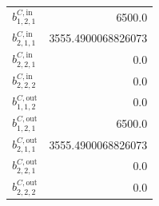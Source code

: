 \documentclass{article}%
\begin{document}
\begin{multicols*}{3}
\begin{supertabular}{lr}
	$b_{1,2,1}^{C,\text{in}}$ & 6500.0 \\%
	$b_{2,1,1}^{C,\text{in}}$ & 3555.4900068826073 \\%
	$b_{2,2,1}^{C,\text{in}}$ & 0.0 \\%
	$b_{2,2,2}^{C,\text{in}}$ & 0.0 \\%
	$b_{1,1,2}^{C,\text{out}}$ & 0.0 \\%
	$b_{1,2,1}^{C,\text{out}}$ & 6500.0 \\%
	$b_{2,1,1}^{C,\text{out}}$ & 3555.4900068826073 \\%
	$b_{2,2,1}^{C,\text{out}}$ & 0.0 \\%
	$b_{2,2,2}^{C,\text{out}}$ & 0.0 \\%
\end{supertabular}%
\end{multicols*}%
\end{document}
